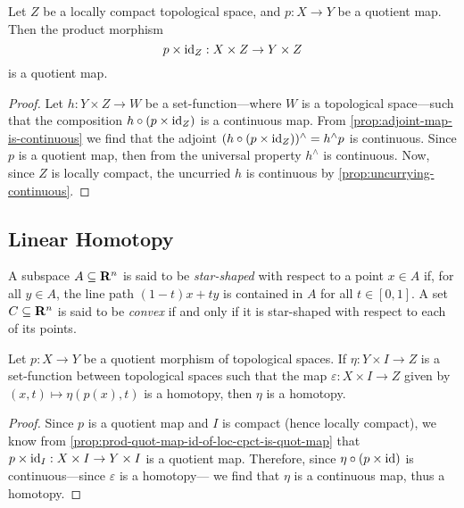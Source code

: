 \begin{proposition}
    \label{prop:prod-quot-map-id-of-loc-cpct-is-quot-map}
    Let \(Z\) be a locally compact topological space, and \(p: X \to Y\) be a
    quotient map. Then the product morphism
    \[
        p \times \operatorname{id}_Z: X \times Z \to Y \times Z
    \]
    is a quotient map.
\end{proposition}

\begin{proof}
    Let \(h: Y \times Z \to W\) be a set-function---where \(W\) is a topological
    space---such that the composition \(h \circ (p \times \operatorname{id}_Z)\) is a continuous
    map. From \cref{prop:adjoint-map-is-continuous} we find that the adjoint
    \((h \circ (p \times \operatorname{id}_Z))^{\wedge} = h^{\wedge} p\) is continuous. Since
    \(p\) is a quotient map, then from the universal property \(h^{\wedge}\) is
    continuous. Now, since \(Z\) is locally compact, the uncurried \(h\) is
    continuous by \cref{prop:uncurrying-continuous}.
\end{proof}

\subsection{Linear Homotopy}

\begin{definition}
    \label{def:star-shaped-space}
    A subspace \(A \subseteq \mathbf{R}^n\) is said to be \emph{star-shaped} with respect to
    a point \(x \in A\) if, for all \(y \in A\), the line path \((1 - t)x + t y\) is
    contained in \(A\) for all \(t \in [0, 1]\). A set \(C \subseteq \mathbf{R}^n\) is said
    to be \emph{convex} if and only if it is star-shaped with respect to each of its
    points.
\end{definition}

\begin{proposition}
    \label{prop:homotopy-from-quotient-map}
    Let \(p: X \to Y\) be a quotient morphism of topological spaces. If
    \(\eta: Y \times I \to Z\) is a set-function between topological spaces such
    that the map \(\varepsilon: X \times I \to Z\) given by
    \((x, t) \mapsto \eta(p(x), t)\) is a homotopy, then \(\eta\) is a homotopy.
\end{proposition}

\begin{proof}
    Since \(p\) is a quotient map and \(I\) is compact (hence locally compact), we
    know from \cref{prop:prod-quot-map-id-of-loc-cpct-is-quot-map} that \(p \times
    \operatorname{id}_I: X \times I \to Y \times I\) is a quotient map. Therefore, since \(\eta
    \circ (p \times \operatorname{id})\) is continuous---since \(\varepsilon\) is a homotopy--- we
    find that \(\eta\) is a continuous map, thus a homotopy.
\end{proof}

